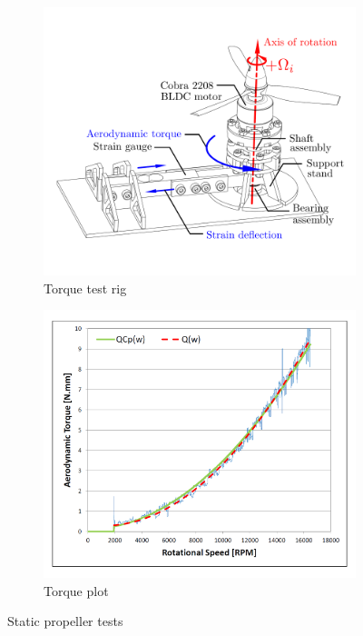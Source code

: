 \begin{figure}[htbp]
\begin{subfigure}{0.5\textwidth}
\includegraphics[width=\textwidth]{figs/torque-rig}
\caption{Torque test rig}
\label{fig:torque-rig}
\end{subfigure}
\begin{subfigure}{0.5\textwidth}
\centering
\includegraphics[width=\textwidth]{graphs/torque-plot}
\caption{Torque plot}
\label{fig:torque-plot}
\end{subfigure}
\caption{Static propeller tests}
\label{fig:propeller-plots}
\vspace{-20pt}
\end{figure}
